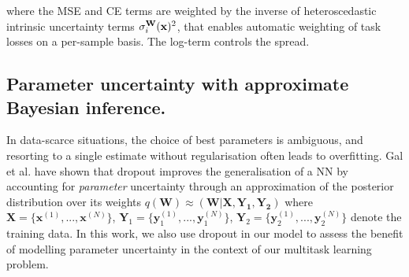 where the MSE and CE terms are weighted by the inverse of heteroscedastic intrinsic uncertainty terms $\sigma^{\mathbf{W}}_{i}(\text{\textbf{x}})^2$, that enables automatic weighting of task losses on a per-sample basis. The log-term controls the spread. 

\subsection{Parameter uncertainty with approximate Bayesian inference.} In data-scarce situations, the choice of best parameters is ambiguous, and resorting to a single estimate without regularisation often leads to overfitting. Gal et al.\cite{gal2016dropout} have shown that dropout improves the generalisation of a NN by accounting for \textit{parameter} uncertainty through an approximation of the posterior distribution over its weights $q(\mathbf{W}) \approx (\mathbf{W}|\mathbf{X},\mathbf{Y_1},\mathbf{Y_2})$ where $\mathbf{X} = \{\mathbf{x}^{(1)}, ..., \mathbf{x}^{(N)}\}$, $\mathbf{Y}_1 = \{\mathbf{y}_1^{(1)}, ..., \mathbf{y}_1^{(N)}\}$, $\mathbf{Y}_2	 = \{\mathbf{y}_2^{(1)}, ..., \mathbf{y}_2^{(N)}\}$ denote the training data. In this work, we also use dropout in our model to assess the benefit of modelling parameter uncertainty in the context of our multitask learning problem.

